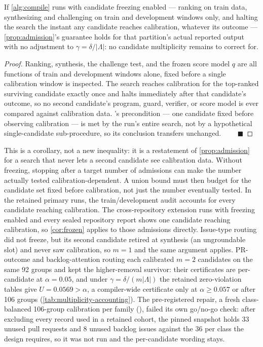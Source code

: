 \begin{corollary}
\label{cor:frozen}
If \cref{alg:compile} runs with candidate freezing enabled --- ranking on train
data, synthesizing and challenging on train and development windows only, and
halting the search the instant any candidate reaches calibration, whatever its
outcome --- \cref{prop:admission}'s guarantee holds for that partition's actual
reported output with no adjustment to $\gamma=\delta/|\Lambda|$: no candidate
multiplicity remains to correct for.
\end{corollary}
\begin{proof}
Ranking, synthesis, the challenge test, and the frozen score model $q$ are all
functions of train and development windows alone, fixed before a single
calibration window is inspected. The search reaches calibration for the
top-ranked surviving candidate exactly once and halts immediately after that
candidate's outcome, so no second candidate's program, guard, verifier, or
score model is ever compared against calibration data.
's precondition --- one candidate fixed before observing
calibration --- is met by the run's entire search, not by a hypothetical
single-candidate sub-procedure, so its conclusion transfers unchanged.
$\qquad\blacksquare$
\end{proof}
This is a corollary, not a new inequality: it is a restatement of
\cref{prop:admission} for a search that never lets a second candidate see
calibration data. Without freezing, stopping after a target number of admissions
can make the number actually tested calibration-dependent. A union bound must
then budget for the candidate set fixed before calibration, not just the
number eventually tested. In the retained primary runs, the train/development
audit accounts for every candidate reaching calibration. The
cross-repository extension runs with freezing enabled and every sealed
repository report shows one candidate reaching calibration, so \cref{cor:frozen}
applies to those admissions directly. Issue-type routing did not freeze, but its
second candidate retired at synthesis (an ungroundable slot) and never saw
calibration, so $m=1$ and the same argument applies. PR-outcome and
backlog-attention routing each calibrated $m=2$ candidates on the same 92
groups and kept the higher-removal survivor: their certificates are
per-candidate at $\alpha=0.05$, and under $\gamma=\delta/(m|\Lambda|)$ the
retained zero-violation tables give $U=0.0569>\alpha$, a compiler-wide
certificate only at $\alpha\ge0.057$ or after 106 groups
(\cref{tab:multiplicity-accounting}). The pre-registered repair, a fresh
class-balanced 106-group calibration per family
(), failed its own
go/no-go check: after excluding every record used in a retained cohort, the
pinned snapshot holds 33 unused  pull requests and 8 unused
 backlog issues against the 36 per class the design requires, so it
was not run and the per-candidate wording stays.

